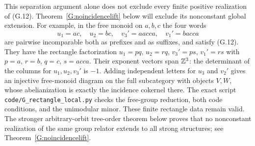 This separation argument alone does not exclude every finite
positive realization of (G.12). Theorem~\ref{G:noincidencelift}
below will exclude its nonconstant global extension.
For example, in the free monoid on $a,b,c$ the four words
\[
 u_1=ac,\quad u_2=bc,\quad
 v_3'=aacca,\quad v_1'=bacca
 \tag{G.14}
\]
are pairwise incomparable both as prefixes and as suffixes,
and satisfy (G.12).  They have the rectangle factorization
$u_1=pq$, $u_2=rq$, $v_3'=ps$, $v_1'=rs$ with
$p=a$, $r=b$, $q=c$, $s=acca$.
Their exponent vectors span $\mathbb Z^3$: the determinant of the
columns for $u_1,u_2,v_3'$ is $-1$.
Adding independent letters for $u_3$ and $v_2'$ gives an
injective free-monoid diagram on the full subcategory with
objects $V,W$, whose abelianization is exactly the incidence
cokernel there.  The exact script
\texttt{code/G\_rectangle\_local.py} checks the free-group
reduction, both code conditions, and the unimodular minor.
These finite rectangle data remain valid. The stronger
arbitrary-orbit tree-order theorem below proves that no
nonconstant realization of the same group relator extends
to all strong structures; see Theorem~\ref{G:noincidencelift}.

